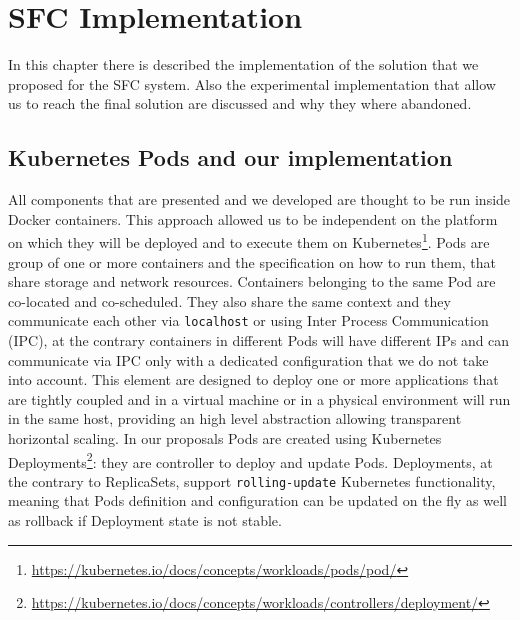 \chapter{SFC Implementation}
\label{chap:impl}

\newcommand{\enchainer}{\texttt{Enchainer}}
\newcommand{\vnf}{\texttt{VNF}}
\newcommand{\vnfs}{\texttt{VNFs}}
\newcommand{\dispatcher}{\texttt{Dispatcher}}
\newcommand{\astaire}{\texttt{Astaire}}
\newcommand{\ironhide}{\texttt{Ironhide}}
\newcommand{\harbor}{\texttt{Harbor}}
\newcommand{\roulette}{\texttt{Roulette}}
\newcommand{\ingress}{\texttt{ingress}}
\newcommand{\ingresses}{\texttt{ingresses}}
\newcommand{\egress}{\texttt{egress}}
\newcommand{\egresses}{\texttt{egresses}}

In this chapter there is described the implementation of the solution that we
proposed for the SFC system. Also the experimental implementation that allow us
to reach the final solution are discussed and why they where abandoned.

\section{Kubernetes Pods and our implementation}
All components that are presented and we developed are thought to be run inside
Docker containers. This approach allowed us to be independent on the platform on
which they will be deployed and to execute them on
Kubernetes\footnote{\url{https://kubernetes.io/docs/concepts/workloads/pods/pod/}}.
Pods are group of one or more containers and the specification on how to run
them, that share storage and network resources. Containers belonging to the same
Pod are co-located and co-scheduled. They also share the same context and they
communicate each other via \texttt{localhost} or using Inter Process
Communication (IPC), at the contrary containers in different Pods will have
different IPs and can communicate via IPC only with a dedicated configuration
that we do not take into account. This element are designed to deploy one or
more applications that are tightly coupled and in a virtual machine or in a
physical environment will run in the same host, providing an high level
abstraction allowing transparent horizontal scaling. In our proposals Pods are
created using Kubernetes
Deployments\footnote{\url{https://kubernetes.io/docs/concepts/workloads/controllers/deployment/}}:
they are controller to deploy and update Pods. Deployments, at the contrary to
ReplicaSets, support \texttt{rolling-update} Kubernetes functionality, meaning
that Pods definition and configuration can be updated on the fly as well as
rollback if Deployment state is not stable. 

